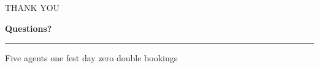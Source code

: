 \documentclass[aspectratio=169,11pt]{beamer}
\begin{document}
\begin{frame}[plain]
  \vfill
  \centering
  {\color{accent}\ttfamily\small THANK YOU}\par\vspace{6pt}
  {\fontsize{30}{32}\selectfont\bfseries Questions?}\par\vspace{10pt}
  {\color{ink}\rule{0.3\textwidth}{0.8pt}}\par\vspace{8pt}
  {\footnotesize\color{muted} Five agents \textbullet{} one fest day \textbullet{} zero double bookings}
  \vfill
\end{frame}
\end{document}

